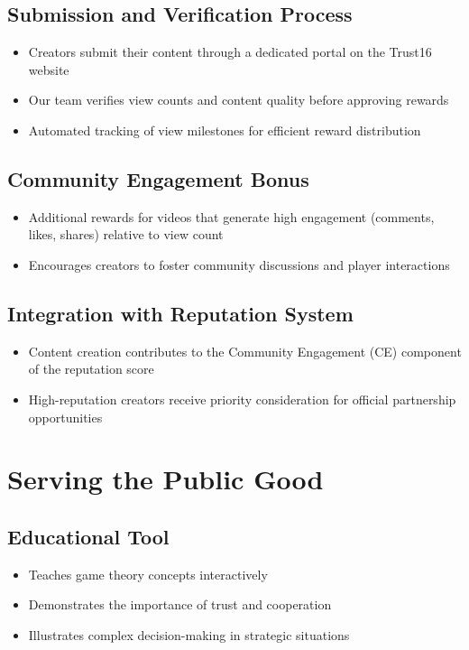 \documentclass[12pt,a4paper]{article}
\begin{document}
\subsection{Submission and Verification Process}
\begin{itemize}
    \item Creators submit their content through a dedicated portal on the Trust16 website
    \item Our team verifies view counts and content quality before approving rewards
    \item Automated tracking of view milestones for efficient reward distribution
\end{itemize}

\subsection{Community Engagement Bonus}
\begin{itemize}
    \item Additional rewards for videos that generate high engagement (comments, likes, shares) relative to view count
    \item Encourages creators to foster community discussions and player interactions
\end{itemize}

\subsection{Integration with Reputation System}
\begin{itemize}
    \item Content creation contributes to the Community Engagement (CE) component of the reputation score
    \item High-reputation creators receive priority consideration for official partnership opportunities
\end{itemize}

\section{Serving the Public Good}

\subsection{Educational Tool}
\begin{itemize}
    \item Teaches game theory concepts interactively
    \item Demonstrates the importance of trust and cooperation
    \item Illustrates complex decision-making in strategic situations
\end{itemize}
\end{document}
